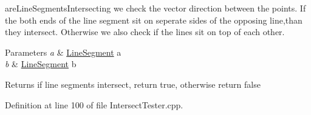 are\+Line\+Segments\+Intersecting we check the vector direction between the points. If the both ends of the line segment sit on seperate sides of the opposing line,than they intersect. Otherwise we also check if the lines sit on top of each other. 


\begin{DoxyParams}{Parameters}
{\em a} & \hyperlink{class_line_segment}{Line\+Segment} a \\
\hline
{\em b} & \hyperlink{class_line_segment}{Line\+Segment} b \\
\hline
\end{DoxyParams}
\begin{DoxyReturn}{Returns}
if line segments intersect, return true, otherwise return false 
\end{DoxyReturn}


Definition at line 100 of file Intersect\+Tester.\+cpp.


